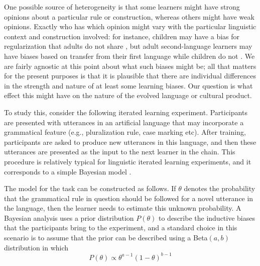 \documentclass[doc]{apa6}
\begin{document}
One possible source of heterogeneity is that some learners might have {\sc strong} opinions about a particular rule or construction, whereas others might have {\sc weak} opinions. Exactly who has which opinion might vary with the particular linguistic context and construction involved: for instance, children may have a bias for regularization that adults do not share \parencite{hudsonkamnewport05}, but adult second-language learners may have biases based on transfer from their first language while children do not \parencite{ellis15}. We are fairly agnostic at this point about what such biases might be; all that matters for the present purposes is that it is plausible that there are individual differences in the strength and nature of at least some learning biases. Our question is what effect this might have on the nature of the evolved language or cultural product.

To study this, consider the following iterated learning experiment. Participants are presented with utterances in an artificial language that may incorporate a grammatical feature (e.g., pluralization rule, case marking etc). After training, participants are asked to produce new utterances in this language, and then these utterances are presented as the input to the next learner in the chain. This procedure is relatively typical for linguistic iterated learning experiments, and it corresponds to a simple Bayesian model \parencite{realigriffiths09,smithwonnacott10,ferdinandetal14}.

The model for the task can be constructed as follows. If $\theta$ denotes the probability that the grammatical rule in question should be followed for a novel utterance in the language, then the learner needs to estimate this unknown probability. A Bayesian analysis uses a prior distribution $P(\theta)$ to describe the inductive biases that the participants bring to the experiment, and a standard choice in this scenario is to assume that the prior can be described using a Beta$(a,b)$ distribution in which
$$
P(\theta) \propto \theta^{a-1} (1-\theta)^{b-1}
$$
\end{document}

